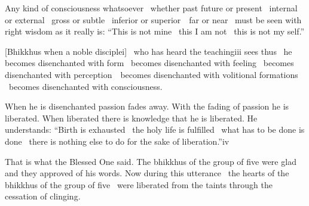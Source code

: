 Any kind of consciousness whatsoever \breathmark\ whether past future or present \breathmark\ internal or external \breathmark\ gross or subtle \breathmark\ inferior or \mbox{superior}~\breathmark\ far or near \breathmark\ must be seen with right wisdom as it really is: ``This is not mine \breathmark\ this I am not \breathmark\ this is not my self.''

[Bhikkhus when a noble disciplei] \breathmark\ who has heard the teachingiii sees thus \breathmark\ he becomes disenchanted with form \breathmark\ becomes disenchanted with feeling \breathmark\ becomes disenchanted with \mbox{perception}~\breathmark\ becomes disenchanted with volitional formations \breathmark\ becomes disenchanted with consciousness.



When he is disenchanted passion fades away. With the fading of passion he is liberated. When liberated there is knowledge that he is liberated. He understands: ``Birth is exhausted \breathmark\ the holy life is fulfilled \breathmark\ what has to be done is done \breathmark\ there is nothing else to do for the sake of liberation.''iv


That is what the Blessed One said. The bhikkhus of the group of five were glad and they approved of his words. Now during this utterance \breathmark\ the hearts of the bhikkhus of the group of five \breathmark\ were liberated from the taints through the cessation of clinging.

\suttaRef{[SN 22.59]}

